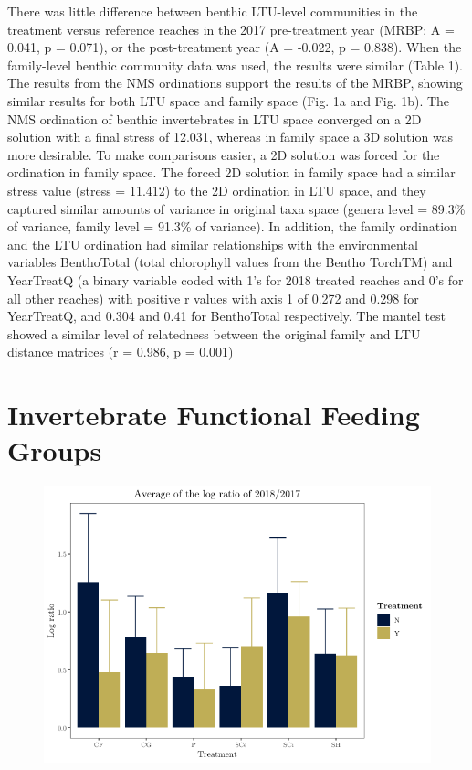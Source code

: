\documentclass[double,12pt]{beavtex}
\begin{document}
  There was little difference between benthic LTU-level communities in the
  treatment versus reference reaches in the 2017 pre-treatment year (MRBP:
  A = 0.041, p = 0.071), or the post-treatment year (A = -0.022, p =
  0.838). When the family-level benthic community data was used, the
  results were similar (Table 1). The results from the NMS ordinations
  support the results of the MRBP, showing similar results for both LTU
  space and family space (Fig. 1a and Fig. 1b). The NMS ordination of
  benthic invertebrates in LTU space converged on a 2D solution with a
  final stress of 12.031, whereas in family space a 3D solution was more
  desirable. To make comparisons easier, a 2D solution was forced for the
  ordination in family space. The forced 2D solution in family space had a
  similar stress value (stress = 11.412) to the 2D ordination in LTU
  space, and they captured similar amounts of variance in original taxa
  space (genera level = 89.3\% of variance, family level = 91.3\% of
  variance). In addition, the family ordination and the LTU ordination had
  similar relationships with the environmental variables BenthoTotal
  (total chlorophyll values from the Bentho TorchTM) and YearTreatQ (a
  binary variable coded with 1's for 2018 treated reaches and 0's for all
  other reaches) with positive r values with axis 1 of 0.272 and 0.298 for
  YearTreatQ, and 0.304 and 0.41 for BenthoTotal respectively. The mantel
  test showed a similar level of relatedness between the original family
  and LTU distance matrices (r = 0.986, p = 0.001)
  
  \section*{Invertebrate Functional Feeding
  Groups}\label{invertebrate-functional-feeding-groups}
  
  \begin{figure}[htbp]
  \centering
  \includegraphics{Final_Figures_and_Stats_files/figure-html/AvgFFGratio-1.png}
  \caption{}
  \end{figure}
  
\end{document}
